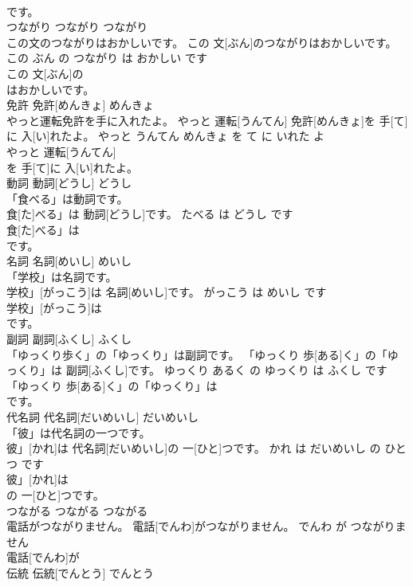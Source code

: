 \documentclass[8pt]{extreport}
\begin{document}
\begin{CJK}{UTF8}{min}
\\	です。			
\\	つながり	つながり	つながり	
\\	この文のつながりはおかしいです。	この 文[ぶん]のつながりはおかしいです。	この ぶん の つながり は おかしい です	
\\	この 文[ぶん]の
\\	はおかしいです。			
\\	免許	免許[めんきょ]	めんきょ	
\\	やっと運転免許を手に入れたよ。	やっと 運転[うんてん] 免許[めんきょ]を 手[て]に 入[い]れたよ。	やっと うんてん めんきょ を て に いれた よ	
\\	やっと 運転[うんてん]
\\	を 手[て]に 入[い]れたよ。			
\\	動詞	動詞[どうし]	どうし	
\\	「食べる」は動詞です。	
\\	食[た]べる」は 動詞[どうし]です。	たべる は どうし です	
\\	食[た]べる」は
\\	です。			
\\	名詞	名詞[めいし]	めいし	
\\	「学校」は名詞です。	
\\	学校」[がっこう]は 名詞[めいし]です。	がっこう は めいし です	
\\	学校」[がっこう]は
\\	です。			
\\	副詞	副詞[ふくし]	ふくし	
\\	「ゆっくり歩く」の「ゆっくり」は副詞です。	「ゆっくり 歩[ある]く」の「ゆっくり」は 副詞[ふくし]です。	ゆっくり あるく の ゆっくり は ふくし です	
\\	「ゆっくり 歩[ある]く」の「ゆっくり」は
\\	です。			
\\	代名詞	代名詞[だいめいし]	だいめいし	
\\	「彼」は代名詞の一つです。	
\\	彼」[かれ]は 代名詞[だいめいし]の 一[ひと]つです。	かれ は だいめいし の ひとつ です	
\\	彼」[かれ]は
\\	の 一[ひと]つです。			
\\	つながる	つながる	つながる	
\\	電話がつながりません。	電話[でんわ]がつながりません。	でんわ が つながりません	
\\	電話[でんわ]が
\\	伝統	伝統[でんとう]	でんとう	

\end{CJK}
\end{document}
